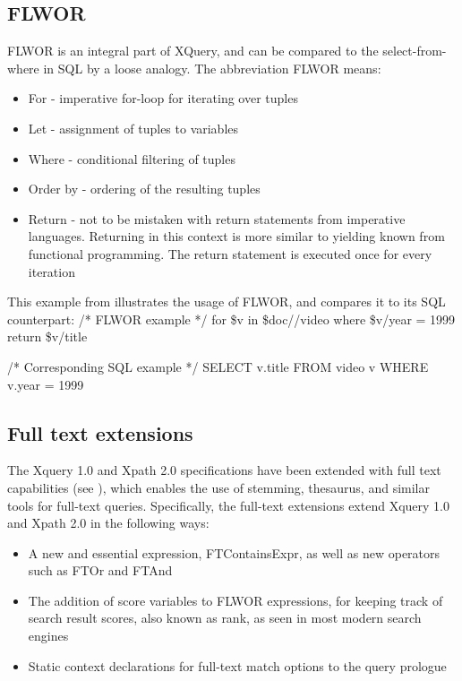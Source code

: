 \subsection{FLWOR}
FLWOR is an integral part of XQuery, and can be compared to the select-from-where in SQL by a loose analogy. The abbreviation FLWOR means:
\begin{itemize}
\item For - imperative for-loop for iterating over tuples
\item Let - assignment of tuples to variables
\item Where - conditional filtering of tuples
\item Order by - ordering of the resulting tuples
\item Return - not to be mistaken with return statements from imperative languages. Returning in this context is more similar to yielding known from functional programming. The return statement is executed once for every iteration
\end{itemize}
This example from \cite{STYL00} illustrates the usage of FLWOR, and compares it to its SQL counterpart:
/* FLWOR example */
for \$v in \$doc//video
where \$v/year = 1999
return \$v/title

/* Corresponding SQL example */
SELECT v.title FROM video v WHERE v.year = 1999

\subsection{Full text extensions}
The Xquery 1.0  and Xpath 2.0 specifications have been extended with full text capabilities (see \cite{W3C02}), which enables the use of stemming, thesaurus, and similar tools for full-text queries. Specifically, the full-text extensions extend Xquery 1.0 and Xpath 2.0 in the following ways:
\begin{itemize}
\item A new and essential expression, FTContainsExpr, as well as new operators such as FTOr and FTAnd
\item The addition of score variables to FLWOR expressions, for keeping track of search result scores, also known as rank, as seen in most modern search engines
\item Static context declarations for full-text match options to the query prologue
\end{itemize}
